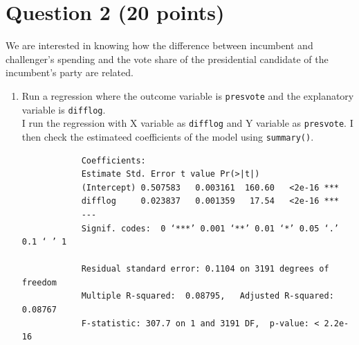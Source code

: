 \documentclass[12pt,letterpaper]{article}
\begin{document}
\section*{Question 2 (20 points)}
\noindent We are interested in knowing how the difference between incumbent and challenger's spending and the vote share of the presidential candidate of the incumbent's party are related.	\vspace{.25cm}
	\begin{enumerate}
		\item Run a regression where the outcome variable is \texttt{presvote} and the explanatory variable is \texttt{difflog}.\\
		I run the regression with X variable as \texttt{difflog} and Y variable as \texttt{presvote}. I then check the estimateed coefficients of the model using \texttt{summary()}.\\
		
		\begin{footnotesize}
				\begin{verbatim}
			Coefficients:
			Estimate Std. Error t value Pr(>|t|)    
			(Intercept) 0.507583   0.003161  160.60   <2e-16 ***
			difflog     0.023837   0.001359   17.54   <2e-16 ***
			---
			Signif. codes:  0 ‘***’ 0.001 ‘**’ 0.01 ‘*’ 0.05 ‘.’ 0.1 ‘ ’ 1
			
			Residual standard error: 0.1104 on 3191 degrees of freedom
			Multiple R-squared:  0.08795,	Adjusted R-squared:  0.08767 
			F-statistic: 307.7 on 1 and 3191 DF,  p-value: < 2.2e-16
			\end{verbatim}
		\end{footnotesize}
		

\end{enumerate}
\end{document}
